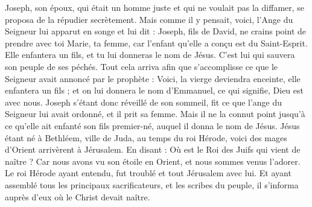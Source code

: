 \begin{multicols}{2}
Joseph, son époux, qui était un homme juste et qui ne voulait pas la diffamer, se proposa de la répudier secrètement.
Mais comme il y pensait, voici, l'Ange du Seigneur{} lui apparut en songe et lui dit : Joseph, fils de David, ne crains point de prendre avec toi Marie, ta femme, car l’enfant qu’elle a conçu est du Saint-Esprit.
Elle enfantera un fils, et tu lui donneras le nom de Jésus. C’est lui qui sauvera son peuple de ses péchés.
Tout cela arriva afin que s’accomplisse ce que le Seigneur avait annoncé par le prophète :
Voici, la vierge deviendra enceinte, elle enfantera un fils ; et on lui donnera le nom d’Emmanuel{}, ce qui signifie, Dieu est avec nous.
Joseph s’étant donc réveillé de son sommeil, fit ce que l'ange du Seigneur lui avait ordonné, et il prit sa femme.
Mais il ne la connut point jusqu'à ce qu'elle ait enfanté son fils premier-né, auquel il donna le nom de Jésus.
\VerseOne{}Jésus étant né à Bethléem, ville de Juda, au temps du roi Hérode, voici des mages d'Orient arrivèrent à Jérusalem.
En disant : Où est le Roi des Juifs qui vient de naître ? Car nous avons vu son étoile en Orient, et nous sommes venus l'adorer.
Le roi Hérode ayant entendu, fut troublé et tout Jérusalem avec lui.
Et ayant assemblé tous les principaux sacrificateurs, et les scribes du peuple, il s'informa auprès d'eux où le Christ devait naître.

\end{multicols}
